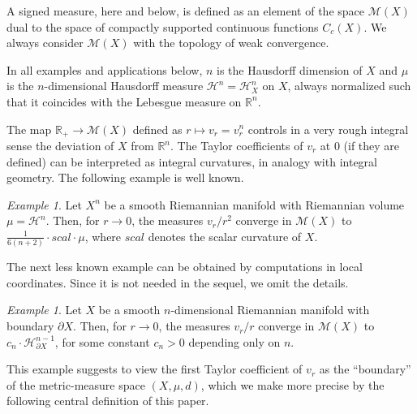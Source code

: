 \documentclass[12pt,leqno]{amsart}
\numberwithin{equation}{section}
\theoremstyle{definition}
\theoremstyle{remark}
\newtheorem{ex}[thm]{Example}
\newcommand{\R}{\mathbb{R}}
\begin{document}
A signed measure, here and below, is defined  as an element of the space $\mathcal M(X)$ dual to the space of compactly supported continuous functions $C_c (X)$.
We always consider $\mathcal M(X)$ with the topology of weak convergence.

In all examples and applications below,  $n$  is the Hausdorff dimension of $X$ and $\mu$ is the $n$-dimensional Hausdorff measure $\mathcal H^n =\mathcal H^n _X$ on $X$, always normalized such that it coincides with the Lebesgue measure on $\R^n$.


The map $\mathbb{R}_+\to\mathcal M(X)$ defined as $r\mapsto  v_r=v_r ^n$ controls in a very rough integral sense the deviation of $X$ from $\R^n$.
The Taylor coefficients of $v_r$ at $0$ (if they are defined) can be interpreted as integral curvatures, in analogy with integral geometry. The following  example is well known.



    \begin{ex} \label{smoothscal}
 Let $X^n$ be a  smooth Riemannian manifold with  Riemannian volume $\mu =\mathcal H^n$.  Then, for $r\to 0$,
  the measures $v_r /r^2$ converge in $\mathcal M(X)$ to $\frac 1 {6(n+2)}\cdot scal \cdot \mu$, where
  $scal$ denotes the scalar curvature of $X$.
\end{ex}



The next less known example can be obtained by computations in local coordinates. Since it is not needed in the sequel, we omit
  the details.




  \begin{ex} \label{mainex}
Let $X$ be a smooth $n$-dimensional Riemannian manifold with boundary $\partial X$.
Then, for $r\to 0$, the measures   $v_r/r$  converge in $\mathcal M(X)$ to
$c_n \cdot \mathcal H^{n-1} _{\partial X}$, for some constant $c_n >0$ depending only on $n$.
\end{ex}

This example  suggests  to view the first Taylor coefficient of $v_r$   as the ``boundary'' of the metric-measure space $(X,\mu,d)$,
 which we make more precise by the following central definition of this paper.
\end{document}
